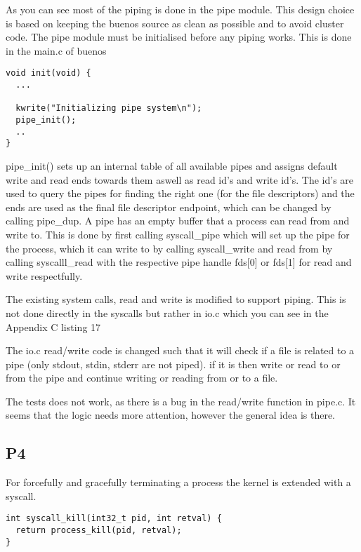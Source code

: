 \documentclass[12pt]{article}
\begin{document}
As you can see most of the piping is done in the pipe module. This design choice is based on keeping the buenos source as clean as possible and to avoid cluster code. The pipe module must be initialised before any piping works. This is done in the main.c of buenos

\begin{lstlisting}[caption=main.c]
void init(void) {
  ...

  kwrite("Initializing pipe system\n");
  pipe_init();
  ..
}
\end{lstlisting}

pipe\_init() sets up an internal table of all available pipes and assigns default write and read ends towards them aswell as read id's and write id's. The id's are used to query the pipes for finding the right one (for the file descriptors) and the ends are used as the final file descriptor endpoint, which can be changed by calling pipe\_dup. A pipe has an empty buffer that a process can read from and write to. This is done by first calling syscall\_pipe which will set up the pipe for the process, which it can write to by calling syscall\_write and read from by calling syscalll\_read with the respective pipe handle fds[0] or fds[1] for read and write respectfully. 

The existing system calls, read and write is modified to support piping. This is not done directly in the syscalls but rather in io.c which you can see in the Appendix C listing 17

The io.c read/write code is changed such that it will check if a file is related to a pipe (only stdout, stdin, stderr are not piped). if it is then write or read to or from the pipe and continue writing or reading from or to a file.  

The tests does not work, as there is a bug in the read/write function in pipe.c. It seems that the logic needs more attention, however the general idea is there. 

\subsection{P4}

For forcefully and gracefully terminating a process the kernel is extended with a syscall.

\begin{lstlisting}[caption=syscall.c]
int syscall_kill(int32_t pid, int retval) {
  return process_kill(pid, retval);
}
\end{lstlisting}
\end{document}
